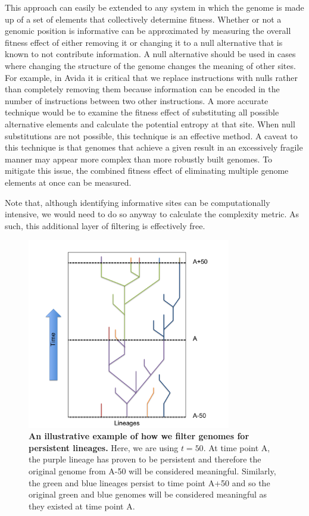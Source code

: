 \documentclass[letterpaper]{article}
\begin{document}
This approach can easily be extended to any system in which the genome is made up of a set of elements that collectively determine fitness. Whether or not a genomic position is informative can be approximated by measuring the overall fitness effect of either removing it or changing it to a null alternative that is known to not contribute information. A null alternative should be used in cases where changing the structure of the genome changes the meaning of other sites. For example, in Avida it is critical that we replace instructions with nulls rather than completely removing them because information can be encoded in the number of instructions between two other instructions. A more accurate technique would be to examine the fitness effect of substituting all possible alternative elements and calculate the potential entropy at that site. When null substitutions are not possible, this technique is an effective method. A caveat to this technique is that genomes that achieve a given result in an excessively fragile manner may appear more complex than more robustly built genomes. To mitigate this issue, the combined fitness effect of eliminating multiple genome elements at once can be measured.

Note that, although identifying informative sites can be computationally intensive, we would need to do so anyway to calculate the complexity metric. As such, this additional layer of filtering is effectively free.

\begin{figure}
\includegraphics[width=3.5in]{figs/LineageFigure.png}
\caption{\textbf{An illustrative example of how we filter genomes for persistent lineages.} Here, we are using $t = 50$. At time point A, the purple lineage has proven to be persistent and therefore the original genome from A-50 will be considered meaningful. Similarly, the green and blue lineages persist to time point A+50 and so the original green and blue genomes will be considered meaningful as they existed at time point A.}
\label{lineages}
\end{figure}
\end{document}
